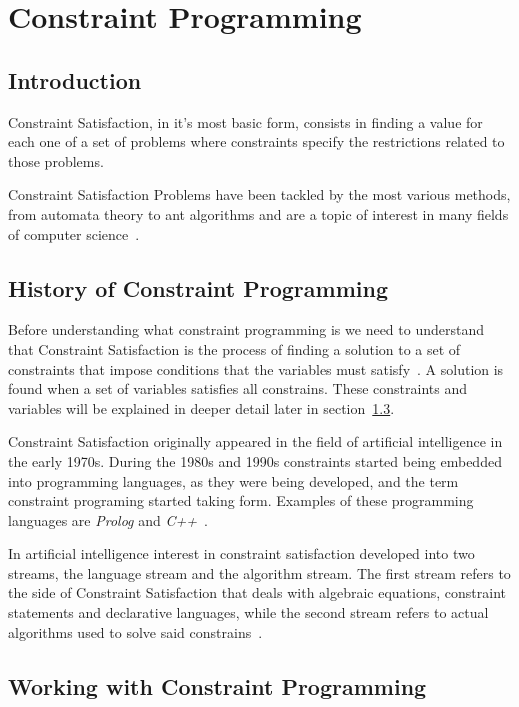 \chapter{Constraint Programming}

\section{Introduction}

Constraint Satisfaction, in it's most basic form, consists in finding a value for each one of a set of problems where constraints specify the restrictions related to those problems.

Constraint Satisfaction Problems have been tackled by the most various methods, from automata theory to ant algorithms and are a topic of interest in many fields of computer science~\cite{Rossi2006}.

\section{History of Constraint Programming}

Before understanding what constraint programming is we need to understand that Constraint Satisfaction is the process of finding a solution to a set of constraints that impose conditions that the variables must satisfy~\cite{Krzysztof2003}. A solution is found when a set of variables satisfies all constrains. These constraints and variables will be explained in deeper detail later in section~\ref{working}.

Constraint Satisfaction originally appeared in the field of artificial intelligence in the early 1970s. During the 1980s and 1990s constraints started being embedded into programming languages, as they were being developed, and the term constraint programing started taking form. Examples of these programming languages are \textit{Prolog} and \textit{C++}~\cite{Krzysztof2003}.

In artificial intelligence interest in constraint satisfaction developed into two streams, the language stream and the algorithm stream. The first stream refers to the side of Constraint Satisfaction that deals with algebraic equations, constraint statements and declarative languages, while the second stream refers to actual algorithms used to solve said constrains~\cite{Rossi2006}.

\section{Working with Constraint Programming}
\label{working}

